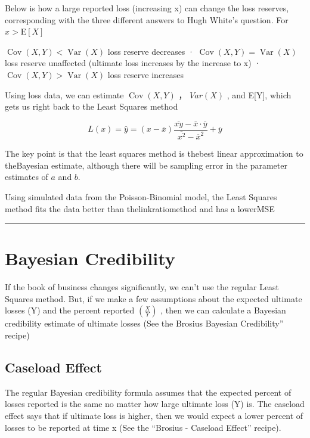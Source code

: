 \documentclass[
]{article}
\begin{document}
Below is how a large reported loss (increasing x) can change the loss
reserves, corresponding with the three different answers to Hugh White's
question. For \(x>\)E\([X]\)

\(\operatorname{Cov}(X,Y)<\operatorname{Var}(X)\) loss reserve decreases
· \(\operatorname{Cov}(X,Y)=\operatorname{Var}(X)\) loss reserve
unaffected (ultimate loss increases by the increase to x) ·
\(\operatorname{Cov}(X,Y)>\operatorname{Var}(X)\) loss reserve increases

Using loss data, we can estimate \(\operatorname{Cov}(X,Y)\) ，
\(Var(X)\) , and E{[}Y{]}, which gets us right back to the Least Squares
method

\[L(x)=\hat{y}=(x-\overline{x})\frac{\overline{xy}-\overline{x}\cdot\overline{y}}{\overline{x^{2}}-\overline{x}^{2}}+\overline{y}\]

The key point is that the least squares method is thebest linear
approximation to theBayesian estimate, although there will be sampling
error in the parameter estimates of \(a\) and \(b.\)

Using simulated data from the Poisson-Binomial model, the Least Squares
method fits the data better than thelinkratiomethod and has a lowerMSE

\begin{center}\rule{0.5\linewidth}{0.5pt}\end{center}

\section{Bayesian Credibility}\label{bayesian-credibility}

If the book of business changes significantly, we can't use the regular
Least Squares method. But, if we make a few assumptions about the
expected ultimate losses (Y) and the percent reported \((\frac{X}{Y})\)
, then we can calculate a Bayesian credibility estimate of ultimate
losses (See the Brosius Bayesian Credibility'' recipe)

\subsection{Caseload Effect}\label{caseload-effect}

The regular Bayesian credibility formula assumes that the expected
percent of losses reported is the same no matter how large ultimate loss
(Y) is. The caseload effect says that if ultimate loss is higher, then
we would expect a lower percent of losses to be reported at time x (See
the ``Brosius - Caseload Effect'' recipe).
\end{document}

